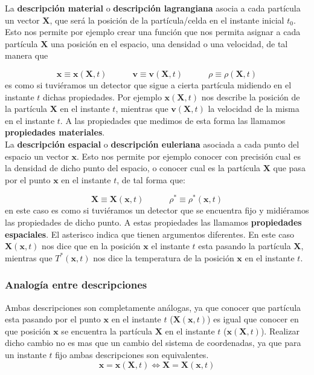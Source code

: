 \documentclass[12pt,a4paper]{article}
\numberwithin{equation}{section}
\numberwithin{figure}{section}
\newcommand{\tquad}{\quad \quad \quad}
\newcommand{\vn}{\mathbf{v}}
\newcommand{\xn}{\mathbf{x}}
\newcommand{\Xn}{\mathbf{X}}
\begin{document}
La \textbf{descripción material} o \textbf{descripción lagrangiana} asocia a cada partícula un vector $\Xn$, que será la posición de la partícula/celda en el instante inicial $t_0$. Esto nos permite por ejemplo crear una función que nos permita asignar a cada partícula $\Xn$ una posición en el espacio, una densidad o una velocidad, de tal manera que

\begin{equation}
\xn \equiv \xn(\Xn,t) \tquad \vn \equiv \vn(\Xn,t) \tquad \rho \equiv \rho (\Xn,t)
\end{equation}
es como si tuviéramos un detector que sigue a cierta partícula midiendo en el instante $t$ dichas propiedades. Por ejemplo $\xn (\Xn,t)$ nos describe la posición de la partícula $\Xn$ en el instante $t$, mientras que $\vn (\Xn,t)$ la velocidad de la misma en el instante $t$. A las propiedades que medimos de esta forma las llamamos \textbf{propiedades materiales}. \\

La \textbf{descripción espacial} o \textbf{descripción euleriana} asociada a cada punto del espacio un vector $\xn$. Esto nos permite por ejemplo conocer con precisión cual es la densidad de dicho punto del espacio, o conocer cual es la partícula $\Xn$ que pasa por el punto $\xn$ en el instante $t$, de tal forma que:

\begin{equation}
\Xn \equiv \Xn (\xn,t) \tquad \rho^* \equiv \rho^* (\xn,t)
\end{equation}
en este caso es como si tuviéramos un detector que se encuentra fijo y midiéramos las propiedades de dicho punto. A estas propiedades las llamamos \textbf{propiedades espaciales}. El asterisco indica que tienen argumentos diferentes. En este caso $\Xn(\xn,t)$ nos dice que en la posición $\xn$ el instante $t$ esta pasando la partícula $\Xn$, mientras que $T^* (\xn,t)$ nos dice la temperatura de la posición $\xn$ en el instante $t$. 

\subsubsection{Analogía entre descripciones}

Ambas descripciones son completamente análogas, ya que conocer que partícula esta pasando por el punto $\xn$ en el instante $t$ ($\Xn (\xn,t)$) es igual que conocer en que posición $\xn$ se encuentra la partícula $\Xn$ en el instante $t$ ($\xn(\Xn,t)$). Realizar dicho cambio no es mas que un cambio del sistema de coordenadas, ya que para un instante $t$ fijo ambas descripciones son equivalentes. \\
\begin{equation}
\xn = \xn (\Xn,t) \Longleftrightarrow \Xn = \Xn (\xn,t)
\end{equation}
\end{document}
